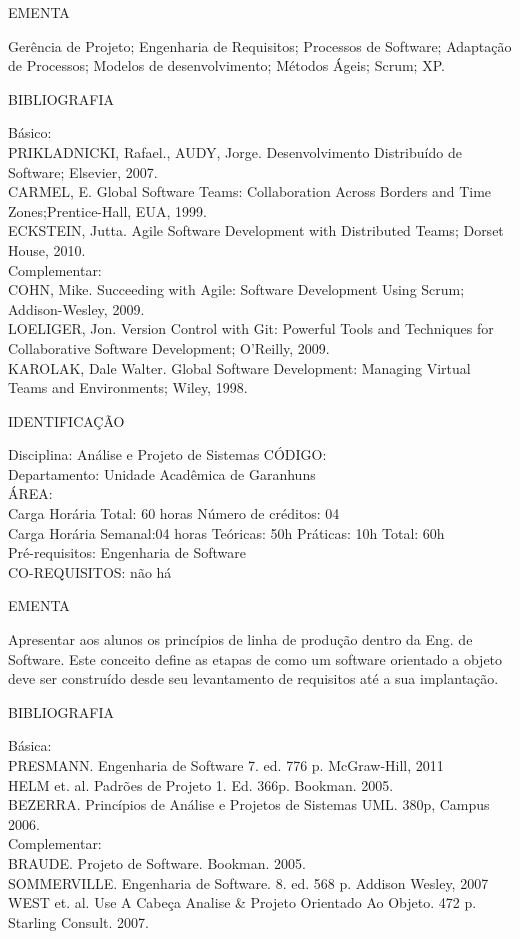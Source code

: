 \documentclass[
	12pt,				%
	openright,			%
  oneside,     %
	a4paper,			%
	english,			%
	french,				%
	spanish,			%
	brazil				%
	]{abntex2}
\begin{document}
\begin{apendicesenv}
EMENTA 

Gerência de Projeto; Engenharia de Requisitos; Processos de Software; Adaptação de Processos; Modelos de desenvolvimento; Métodos Ágeis; Scrum; XP.

BIBLIOGRAFIA 

Básico:\\
PRIKLADNICKI, Rafael., AUDY, Jorge. Desenvolvimento Distribuído de
Software; Elsevier, 2007.\\
CARMEL, E. Global Software Teams: Collaboration Across Borders and Time
Zones;Prentice-Hall, EUA, 1999.\\
ECKSTEIN, Jutta. Agile Software Development with Distributed Teams;
Dorset House, 2010.\\
Complementar:\\
COHN, Mike. Succeeding with Agile: Software Development Using Scrum;
Addison-Wesley, 2009.\\
LOELIGER, Jon. Version Control with Git: Powerful Tools and Techniques
for Collaborative Software Development; O'Reilly,
2009.\\
KAROLAK, Dale Walter. Global Software Development: Managing Virtual
Teams and Environments; Wiley, 1998.

\newpage IDENTIFICAÇÃO

Disciplina: Análise e Projeto de Sistemas CÓDIGO:\\ 
Departamento: Unidade Acadêmica de Garanhuns\\
ÁREA: \\
Carga Horária Total: 60 horas Número de créditos: 04\\
Carga Horária Semanal:04 horas Teóricas: 50h Práticas: 10h Total: 60h\\
Pré-requisitos: Engenharia de Software\\
CO-REQUISITOS: não há

EMENTA 

Apresentar aos alunos os princípios de linha de produção dentro da Eng. de Software. Este conceito define as etapas de como um software orientado a objeto deve ser construído desde seu levantamento de requisitos até a sua implantação.

BIBLIOGRAFIA 

Básica:\\
PRESMANN. Engenharia de Software 7. ed. 776 p. McGraw-Hill, 2011\\
HELM et. al. Padrões de Projeto 1. Ed. 366p. Bookman. 2005.\\
BEZERRA. Princípios de Análise e Projetos de Sistemas UML. 380p, Campus 2006.\\
Complementar:\\
BRAUDE. Projeto de Software. Bookman. 2005.\\
SOMMERVILLE. Engenharia de Software. 8. ed. 568 p. Addison Wesley, 2007\\
WEST et. al. Use A Cabeça Analise \& Projeto Orientado Ao Objeto. 472 p.
Starling Consult. 2007.


\end{apendicesenv}
\end{document}
